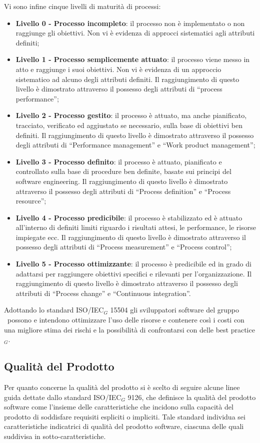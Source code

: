 \smallskip
Vi sono infine cinque livelli di maturità di processi:
\smallskip
\begin{itemize}
	\item \textbf{Livello 0 - Processo incompleto}: il processo non è implementato o non raggiunge gli obiettivi. Non vi è evidenza di approcci sistematici agli
	attributi definiti;
	\item \textbf{Livello 1 - Processo semplicemente attuato}: il processo viene messo in atto e raggiunge i suoi obiettivi. Non vi è evidenza di un approccio sistematico ad alcuno degli attributi definiti. Il raggiungimento di questo livello è dimostrato attraverso il possesso degli attributi di ``process performance'';
	\item \textbf{Livello 2 - Processo gestito}: il processo è attuato, ma anche pianificato, tracciato, verificato ed aggiustato se necessario, sulla base di obiettivi ben definiti. Il raggiungimento di questo livello è dimostrato attraverso il possesso degli attributi di ``Performance management'' e ``Work product management'';
	\item \textbf{Livello 3 - Processo definito}: il processo è attuato, pianificato e controllato sulla base di procedure ben definite, basate sui principi del software engineering. Il raggiungimento di questo livello è dimostrato attraverso il possesso degli attributi di ``Process definition'' e ``Process resource'';
	\item \textbf{Livello 4 - Processo predicibile}: il processo è stabilizzato ed è attuato all'interno di definiti limiti riguardo i risultati attesi, le performance, le	risorse impiegate ecc. Il raggiungimento di questo livello è dimostrato attraverso il possesso degli attributi di ``Process measurement'' e ``Process control'';
	\item \textbf{Livello 5 - Processo ottimizzante}: il processo è predicibile ed in grado di adattarsi per raggiungere obiettivi specifici e rilevanti per l'organizzazione. Il raggiungimento di questo livello è dimostrato attraverso il possesso degli attributi di ``Process change'' e ``Continuous integration''.
\end{itemize}
Adottando lo standard ISO/IEC$_G$ 15504 gli sviluppatori software del gruppo 	\gruppo\ possono e intendono ottimizzare l'uso delle risorse e contenere così i costi con una migliore stima dei rischi e la possibilità di confrontarsi con delle best practice$_G$.

\subsection{Qualità del Prodotto}
Per quanto concerne la qualità del prodotto si è scelto di seguire alcune linee
guida dettate dallo standard ISO/IEC$_G$ 9126, che definisce la qualità del
prodotto software come l'insieme delle caratteristiche che incidono sulla capacità del prodotto di soddisfare requisiti espliciti o impliciti. Tale standard individua sei caratteristiche indicatrici di qualità del prodotto software, ciascuna delle quali suddivisa in sotto-caratteristiche.
